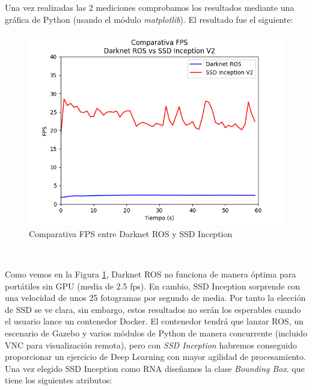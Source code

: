 Una vez realizadas las 2 mediciones comprobamos los resultados mediante una gráfica de Python (usando el módulo \textit{matplotlib}). El resultado fue el siguiente:

\begin{figure} [H]
  \begin{center}
    \includegraphics[width=12cm]{imagenes/cap5/comparativa-fps-models.png}
  \end{center}
  \caption[Comparativa FPS entre Darknet ROS y SSD Inception]{Comparativa FPS entre Darknet ROS y SSD Inception}
  \label{fig:comparativa_fps_models}
\end{figure}\

Como vemos en la Figura \ref{fig:comparativa_fps_models}, Darknet ROS no funciona de manera óptima para portátiles sin GPU (media de 2.5 fps). En cambio, SSD Inception sorprende con una velocidad de unos 25 fotogramas por segundo de media. Por tanto la elección de SSD se ve clara, sin embargo, estos resultados no serán los esperables cuando el usuario lance un contenedor Docker. El contenedor tendrá que lanzar ROS, un escenario de Gazebo y varios módulos de Python de manera concurrente (incluido VNC para visualización remota), pero con \textit{SSD Inception} habremos conseguido proporcionar un ejercicio de Deep Learning con mayor agilidad de procesamiento.\\

Una vez elegido SSD Inception como RNA diseñamos la clase \textit{Bounding Box}. que tiene los siguientes atributos:

